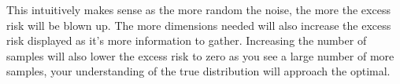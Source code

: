 This intuitively makes sense as the more random the noise, the more the excess risk will be blown up. The more dimensions needed will also increase the excess risk displayed as it's more information to gather. Increasing the number of samples will also lower the excess risk to zero as you see a large number of more samples, your understanding of the true distribution will approach the optimal. 







